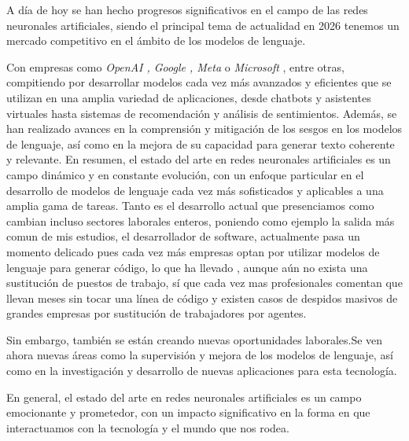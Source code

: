 A día de hoy se han hecho progresos significativos en el campo de las redes neuronales artificiales, siendo el principal tema de actualidad en 2026 tenemos un mercado competitivo en el ámbito de los modelos de lenguaje.

Con empresas como \textit{OpenAI , Google , Meta} o \textit{Microsoft} , entre otras, compitiendo por desarrollar modelos cada vez más avanzados y eficientes que se utilizan en una amplia variedad de aplicaciones, desde chatbots y asistentes virtuales hasta sistemas de recomendación y análisis de sentimientos. Además, se han realizado avances en la comprensión y mitigación de los sesgos en los modelos de lenguaje, así como en la mejora de su capacidad para generar texto coherente y relevante. En resumen, el estado del arte en redes neuronales artificiales es un campo dinámico y en constante evolución, con un enfoque particular en el desarrollo de modelos de lenguaje cada vez más sofisticados y aplicables a una amplia gama de tareas. Tanto es el desarrollo actual que presenciamos como cambian incluso sectores laborales enteros, poniendo como ejemplo la salida más comun de mis estudios, el desarrollador de software, actualmente pasa un momento delicado pues cada vez más empresas optan por utilizar modelos de lenguaje para generar código, lo que ha llevado , aunque aún no exista una sustitución de puestos de trabajo, sí que cada vez mas profesionales comentan que llevan meses sin tocar una línea de código y existen casos de despidos masivos de grandes empresas por sustitución de trabajadores por agentes.

Sin embargo, también se están creando nuevas oportunidades laborales.Se ven ahora nuevas áreas como la supervisión y mejora de los modelos de lenguaje, así como en la investigación y desarrollo de nuevas aplicaciones para esta tecnología.

En general, el estado del arte en redes neuronales artificiales es un campo emocionante y prometedor, con un impacto significativo en la forma en que interactuamos con la tecnología y el mundo que nos rodea.